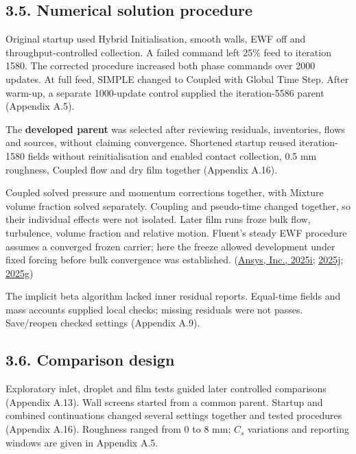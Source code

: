 \documentclass[
  12pt,
  a4paper,
]{article}
\begin{document}
\subsection{3.5. Numerical solution
procedure}\label{numerical-solution-procedure}

Original startup used Hybrid Initialisation, smooth walls, EWF off and
throughput-controlled collection. A failed command left 25\% feed to
iteration 1580. The corrected procedure increased both phase commands
over 2000 updates. At full feed, SIMPLE changed to Coupled with Global
Time Step. After warm-up, a separate 1000-update control supplied the
iteration-5586 parent (Appendix A.5).

The \textbf{developed parent} was selected after reviewing residuals,
inventories, flows and sources, without claiming convergence. Shortened
startup reused iteration-1580 fields without reinitialisation and
enabled contact collection, 0.5 mm roughness, Coupled flow and dry film
together (Appendix A.16).

Coupled solved pressure and momentum corrections together, with Mixture
volume fraction solved separately. Coupling and pseudo-time changed
together, so their individual effects were not isolated. Later film runs
froze bulk flow, turbulence, volume fraction and relative motion.
Fluent's steady EWF procedure assumes a converged frozen carrier; here
the freeze allowed development under fixed forcing before bulk
convergence was established.
(\href{https://ansyshelp.ansys.com/public/Views/Secured/corp/v252/en/flu_ug/flu_ug_sec_uns_solve_pvel_1.html}{Ansys,
Inc., 2025i};
\href{https://ansyshelp.ansys.com/public/Views/Secured/corp/v252/en/flu_ug/flu_ug_sec_multiphase_solution.html}{2025j};
\href{https://ansyshelp.ansys.com/public/Views/Secured/corp/v252/en/flu_th/flu_th_ewf_sec_sol_alg.html}{2025g})

The implicit beta algorithm lacked inner residual reports. Equal-time
fields and mass accounts supplied local checks; missing residuals were
not passes. Save/reopen checked settings (Appendix A.9).

\subsection{3.6. Comparison design}\label{comparison-design}

Exploratory inlet, droplet and film tests guided later controlled
comparisons (Appendix A.13). Wall screens started from a common parent.
Startup and combined continuations changed several settings together and
tested procedures (Appendix A.16). Roughness ranged from 0 to 8 mm;
\(C_s\) variations and reporting windows are given in Appendix A.5.
\end{document}
